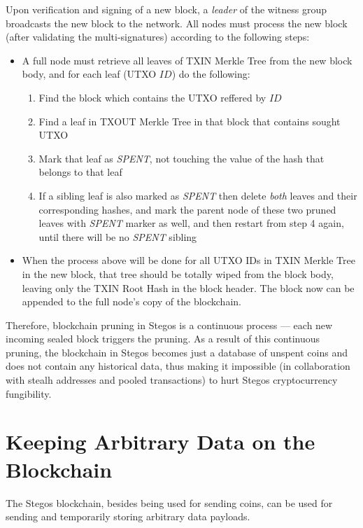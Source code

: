 \documentclass[a4paper, 10pt, conference]{ieeeconf}
\begin{document}
Upon verification and signing of a new block, a \textit{leader} of the witness group broadcasts the new block to the network. All nodes must process the new block (after validating the multi-signatures) according to the following steps:

\begin{itemize}
	\item {A full node must retrieve all leaves of TXIN Merkle Tree from the new block body, and for each leaf (UTXO $ID$) do the following:
	\begin{enumerate}
		\item {Find the block which contains the UTXO reffered by $ID$}
		   \item {Find a leaf in TXOUT Merkle Tree in that block that contains sought UTXO}
		\item {Mark that leaf as \textit{SPENT}, not touching the value of the hash that belongs to that leaf}
		\item {If a sibling leaf is also marked as \textit{SPENT} then delete \textit{both} leaves and their corresponding hashes, and mark the parent node of these two pruned leaves with \textit{SPENT} marker as well, and then restart from step 4 again, until there will be no \textit{SPENT} sibling}
	\end{enumerate}} 
	\item {When the process above will be done for all UTXO IDs in TXIN Merkle Tree in the new block, that tree should be totally wiped from the block body, leaving only the TXIN Root Hash in the block header. The block now can be appended to the full node's copy of the blockchain.}
\end{itemize}

Therefore, blockchain pruning in Stegos is a continuous process --- each new incoming sealed block triggers the pruning. As a result of this continuous pruning, the blockchain in Stegos becomes just a database of unspent coins and does not contain any historical data, thus making it impossible (in collaboration with stealh addresses and pooled transactions) to hurt Stegos cryptocurrency fungibility.

\section{Keeping Arbitrary Data on the Blockchain} \label{data}

The Stegos blockchain, besides being used for sending coins, can be used for sending and temporarily storing arbitrary data payloads. 
\end{document}
